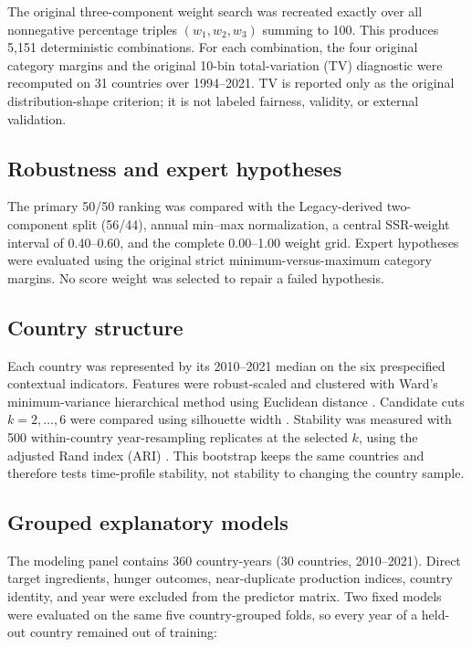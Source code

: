 \documentclass[11pt]{article}
\begin{document}
The original three-component weight search was recreated exactly over all nonnegative percentage triples $(w_1,w_2,w_3)$ summing to 100. This produces 5,151 deterministic combinations. For each combination, the four original category margins and the original 10-bin total-variation (TV) diagnostic were recomputed on 31 countries over 1994--2021. TV is reported only as the original distribution-shape criterion; it is not labeled fairness, validity, or external validation.

\subsection{Robustness and expert hypotheses}

The primary 50/50 ranking was compared with the Legacy-derived two-component split (56/44), annual min--max normalization, a central SSR-weight interval of 0.40--0.60, and the complete 0.00--1.00 weight grid. Expert hypotheses were evaluated using the original strict minimum-versus-maximum category margins. No score weight was selected to repair a failed hypothesis.

\subsection{Country structure}

Each country was represented by its 2010--2021 median on the six prespecified contextual indicators. Features were robust-scaled and clustered with Ward's minimum-variance hierarchical method using Euclidean distance \cite{ward1963}. Candidate cuts $k=2,\ldots,6$ were compared using silhouette width \cite{rousseeuw1987}. Stability was measured with 500 within-country year-resampling replicates at the selected $k$, using the adjusted Rand index (ARI) \cite{hubertarabie1985}. This bootstrap keeps the same countries and therefore tests time-profile stability, not stability to changing the country sample.

\subsection{Grouped explanatory models}

The modeling panel contains 360 country-years (30 countries, 2010--2021). Direct target ingredients, hunger outcomes, near-duplicate production indices, country identity, and year were excluded from the predictor matrix. Two fixed models were evaluated on the same five country-grouped folds, so every year of a held-out country remained out of training:
\end{document}
